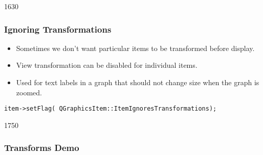\begin{slide}{1630}\frametitle{Ignoring Transformations}
\begin{itemize}
\item Sometimes we don't want particular items to be transformed before display.
\item View transformation can be disabled for individual items.
\item Used for text labels in a graph that should not change size when the graph is zoomed.
\end{itemize}
\small{
\texttt{item->setFlag( QGraphicsItem::ItemIgnoresTransformations);}
}


\end{slide}


\begin{slide}{1750}

\frametitle{Transforms Demo}


\end{slide}


